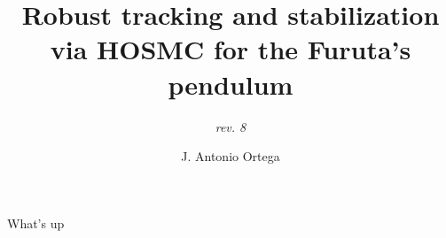 \documentclass[10pt,letterpaper]{scrartcl}
\title{ Robust tracking and stabilization via HOSMC for the Furuta's pendulum}
\subtitle{ \textit{rev. 8 }}
\author{J. Antonio Ortega}
\begin{document}
    What's up
\end{document}
